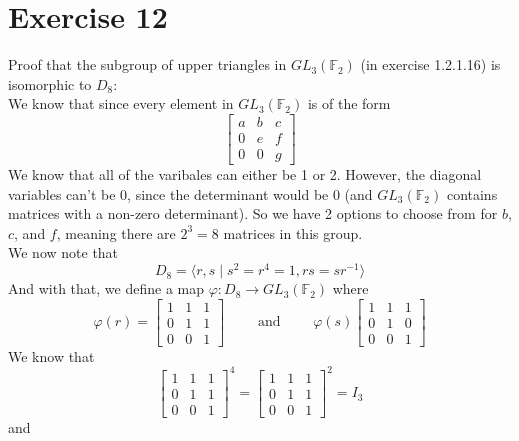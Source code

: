 \documentclass{article}
\newcommand{\F}{\mathbb{F}}
\begin{document}
    \section*{Exercise 12}
    Proof that the subgroup of upper triangles in $GL_3(\F_2)$
    (in exercise 1.2.1.16) is isomorphic to $D_8$: \\
    We know that since every element in $GL_3(\F_2)$
    is of the form
    \[ \begin{bmatrix} a & b & c \\
        0 & e & f \\
        0 & 0 & g \end{bmatrix} \]
    We know that all of the varibales can either be 1 or 2.
    However, the diagonal variables can't be 0,
    since the determinant would be 0
    (and $GL_3(\F_2)$ contains matrices with a non-zero determinant).
    So we have 2 options to choose from for $b$, $c$, and $f$,
    meaning there are $2^3 = 8$ matrices in this group. \\
    We now note that 
    \[ D_{8} = \langle r, s \mid s^2 = r^4 = 1, rs = sr^{-1} \rangle \]
    And with that, we define a map
    $\varphi: D_8 \to GL_3(\F_2)$
    where
    \[ \varphi(r) = \begin{bmatrix} 1 & 1 & 1 \\
        0 & 1 & 1 \\
        0 & 0 & 1 \end{bmatrix} \qquad
        \text{ and } \qquad
    \varphi(s) \begin{bmatrix} 1 & 1 & 1 \\
        0 & 1 & 0 \\
        0 & 0 & 1 \end{bmatrix} \]
    We know that
    \[ \begin{bmatrix} 1 & 1 & 1 \\
        0 & 1 & 1 \\
        0 & 0 & 1 \end{bmatrix}^4
    = \begin{bmatrix} 1 & 1 & 1 \\
        0 & 1 & 1 \\
        0 & 0 & 1 \end{bmatrix}^2 = I_3 \] 
    and
\end{document}
